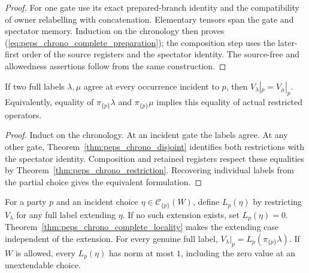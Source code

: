 \begin{proof}
    \leanok
    For one gate use its exact prepared-branch identity and the compatibility of
    owner relabelling with concatenation. Elementary tensors span the gate and
    spectator memory. Induction on the chronology then proves
    (\ref{eq:peps_chrono_complete_preparation}); the composition step uses the
    later-first order of the source registers and the spectator identity. The
    source-free and allowedness assertions follow from the same construction.
\end{proof}

\begin{theorem}
    \label{thm:peps_chrono_complete_locality}
    \leanok
    If two full labels $\lambda,\mu$ agree at every occurrence incident to $p$,
    then $V_\lambda|_p=V_\mu|_p$. Equivalently, equality of
    $\pi_{\{p\}}\lambda$ and $\pi_{\{p\}}\mu$ implies this equality of actual
    restricted operators.
\end{theorem}

\begin{proof}
    \leanok
    Induct on the chronology. At an incident gate the labels agree. At any other
    gate, Theorem~\ref{thm:peps_chrono_disjoint} identifies both restrictions with
    the spectator identity. Composition and retained registers respect these
    equalities by Theorem~\ref{thm:peps_chrono_restriction}. Recovering individual
    labels from the partial choice gives the equivalent formulation.
\end{proof}

\begin{definition}
    \label{def:peps_chrono_complete_local_maps}
    \leanok
    For a party $p$ and an incident choice $\eta\in\mathcal C_{\{p\}}(W)$,
    define $L_p(\eta)$ by restricting $V_\lambda$ for any full label extending
    $\eta$. If no such extension exists, set $L_p(\eta)=0$.
    Theorem~\ref{thm:peps_chrono_complete_locality} makes the extending case
    independent of the extension. For every genuine full label,
    $V_\lambda|_p=L_p(\pi_{\{p\}}\lambda)$.
    If $W$ is allowed, every $L_p(\eta)$ has norm at most $1$, including the
    zero value at an unextendable choice.
\end{definition}

